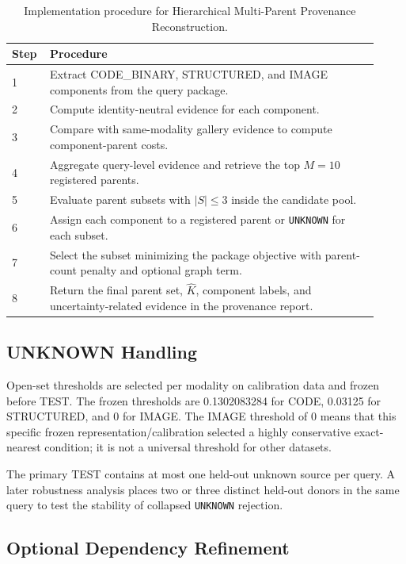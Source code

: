 \documentclass[runningheads]{llncs}
\begin{document}
\begin{table}[!htbp]
\centering
\caption{Implementation procedure for Hierarchical Multi-Parent Provenance Reconstruction.}
\label{tab:algorithm}
\scriptsize
\begin{tabular}{p{0.08\linewidth}p{0.84\linewidth}}
\toprule
Step & Procedure\\
\midrule
1 & Extract CODE\_BINARY, STRUCTURED, and IMAGE components from the query package.\\
2 & Compute identity-neutral evidence for each component.\\
3 & Compare with same-modality gallery evidence to compute component-parent costs.\\
4 & Aggregate query-level evidence and retrieve the top $M=10$ registered parents.\\
5 & Evaluate parent subsets with $|S|\le3$ inside the candidate pool.\\
6 & Assign each component to a registered parent or \texttt{UNKNOWN} for each subset.\\
7 & Select the subset minimizing the package objective with parent-count penalty and optional graph term.\\
8 & Return the final parent set, $\hat K$, component labels, and uncertainty-related evidence in the provenance report.\\
\bottomrule
\end{tabular}
\end{table}

\subsection{UNKNOWN Handling}

Open-set thresholds are selected per modality on calibration data and frozen before TEST. The frozen thresholds are 0.1302083284 for CODE, 0.03125 for STRUCTURED, and 0 for IMAGE. The IMAGE threshold of 0 means that this specific frozen representation/calibration selected a highly conservative exact-nearest condition; it is not a universal threshold for other datasets.

The primary TEST contains at most one held-out unknown source per query. A later robustness analysis places two or three distinct held-out donors in the same query to test the stability of collapsed \texttt{UNKNOWN} rejection.

\subsection{Optional Dependency Refinement}
\end{document}
